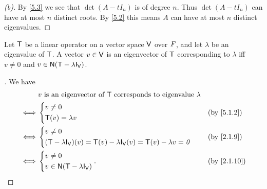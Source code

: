 \begin{proof}[(b)]
  By \cref{5.3} we see that \(\det(A - t I_n)\) is of degree \(n\).
  Thus \(\det(A - t I_n)\) can have at most \(n\) distinct roots.
  By \cref{5.2} this means \(A\) can have at most \(n\) distinct eigenvalues.
\end{proof}

\begin{thm}\label{5.4}
  Let \(\mathsf{T}\) be a linear operator on a vector space \(\mathsf{V}\) over \(\mathit{F}\), and let \(\lambda\) be an eigenvalue of \(\mathsf{T}\).
  A vector \(v \in \mathsf{V}\) is an eigenvector of \(\mathsf{T}\) corresponding to \(\lambda\) iff \(v \neq 0\) and \(v \in \ns{\T - \lambda \IT[\V]}\).
\end{thm}

\begin{proof}[]
  We have
  \begin{align*}
         & v \text{ is an eigenvector of } \T \text{ corresponds to eigenvalue } \lambda                             \\
    \iff & \begin{dcases}
             v \neq 0 \\
             \T(v) = \lambda v
           \end{dcases}                                                                &  & \text{(by \cref{5.1.2})} \\
    \iff & \begin{dcases}
             v \neq 0 \\
             (\T - \lambda \IT[\V])(v) = \T(v) - \lambda \IT[\V](v) = \T(v) - \lambda v = \zv
           \end{dcases} &  & \text{(by \cref{2.1.9})}                           \\
    \iff & \begin{dcases}
             v \neq 0 \\
             v \in \ns{\T - \lambda \IT[\V]}
           \end{dcases}.                                   &  & \text{(by \cref{2.1.10})}
  \end{align*}
\end{proof}

